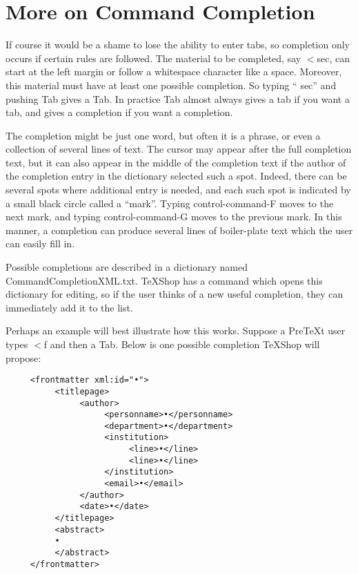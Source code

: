 \documentclass[11pt, oneside]{article}   	%
\begin{document}
\section{More on Command Completion}
 
 If course it would be a shame to lose the ability to enter tabs, so  completion only occurs if certain rules are followed. The material to be completed, say $<$sec, can start at the left margin or follow a whitespace character like a space. Moreover,  this material must have at least one possible completion. So typing `` sec'' and pushing Tab gives a Tab.
 In practice Tab almost always gives a tab if you want a tab, and gives a completion if you want a completion.
 
The completion might be just one word, but often it is a phrase, or even a collection of several lines of text. The cursor may appear after the full completion text, but it can also appear in the middle of the completion text if the author of the completion entry in the dictionary selected such a spot. Indeed, there can be several spots where additional entry is needed, and each such spot is indicated by a small black circle called a ``mark''. Typing control-command-F moves to the next mark, and typing control-command-G moves to the previous mark. In this manner, a completion can produce several lines of boiler-plate text which the user can easily fill in.

Possible completions are described in a dictionary named CommandCompletionXML.txt. TeXShop has a command which opens this dictionary for editing, so if the user thinks of a new useful completion, they can immediately add it to the list.

Perhaps an example will best illustrate how this works. Suppose a PreTeXt user types $<$f and then a Tab.
Below is  one possible completion TeXShop will propose:

\begin{verbatim}
     <frontmatter xml:id="•"> 
          <titlepage> 
               <author> 
                    <personname>•</personname> 
                    <department>•</department> 
                    <institution> 
                         <line>•</line> 
                         <line>•</line> 
                    </institution> 
                    <email>•</email> 
               </author> 
               <date>•</date> 
          </titlepage> 
          <abstract> 
          • 
          </abstract> 
     </frontmatter>
\end{verbatim}
\end{document}

